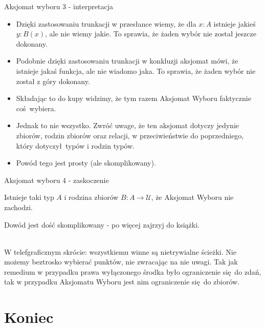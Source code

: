 \documentclass{beamer}
\newcommand{\U}{\mathcal{U}}
\begin{document}
\begin{frame}{Aksjomat wyboru 3 - interpretacja}
\begin{itemize}
	\item Dzięki zastosowaniu trunkacji w przesłance wiemy, że dla $x : A$ istnieje jakieś $y : B(x)$, ale nie wiemy jakie. To sprawia, że żaden wybór nie został jeszcze dokonany.
	\item Podobnie dzięki zastosowaniu trunkacji w konkluzji aksjomat mówi, że istnieje jakaś funkcja, ale nie wiadomo jaka. To sprawia, że żaden wybór nie został z góry dokonany.
	\item Składając to do kupy widzimy, że tym razem Aksjomat Wyboru faktycznie coś wybiera.
	\item Jednak to nie wszystko. Zwróć uwage, że ten aksjomat dotyczy jedynie zbiorów, rodzin zbiorów oraz relacji, w przeciwieństwie do poprzedniego, który dotyczył typów i rodzin typów.
	\item Powód tego jest prosty (ale skomplikowany).
\end{itemize}
\end{frame}

\begin{frame}{Aksjomat wyboru 4 - zaskoczenie}

\begin{theorem}[Lemat 3.8.5]
Istnieje taki typ $A$ i rodzina zbiorów $B : A \to \U$, że Aksjomat Wyboru nie zachodzi.
\end{theorem}

Dowód jest dość skomplikowany - po więcej zajrzyj do książki. \\~\

W telefgraficznym skrócie: wszystkiemu winne są nietrywialne ścieżki. Nie możemy beztrosko wybierać punktów, nie zwracając na nie uwagi. Tak jak remedium w przypadku prawa wyłączonego środka było ograniczenie się do zdań, tak w przypadku Aksjomatu Wyboru jest nim ograniczenie się do zbiorów.

\end{frame}

\section{Koniec}
\end{document}
